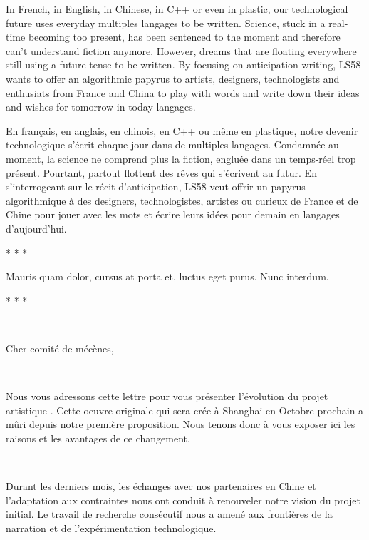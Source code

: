 In French, in English, in Chinese, in C++ or even in plastic, our
technological future uses everyday multiples langages to be written.
Science, stuck in a real-time becoming too present, has been sentenced
to the moment and therefore can{\textquoteright}t understand fiction
anymore. However, dreams that are floating everywhere still using a
future tense to be written. By focusing on anticipation writing, LS58
wants to offer an algorithmic papyrus to artists, designers,
technologists and enthusiats from France and China to play with words
and write down their ideas and wishes for tomorrow in today langages.

En fran\c{c}ais, en anglais, en chinois, en C++ ou m\^eme en plastique,
notre devenir technologique s{\textquoteright}\'ecrit chaque jour dans
de multiples langages. Condamn\'ee au moment, la science ne comprend
plus la fiction, englu\'ee dans un temps-r\'eel trop pr\'esent.
Pourtant, partout flottent des r\^eves qui s{\textquoteright}\'ecrivent
au futur. En s{\textquoteright}interrogeant sur le r\'ecit
d{\textquoteright}anticipation, LS58 veut offrir un papyrus
algorithmique \`a des designers, technologistes, artistes ou curieux de
France et de Chine pour jouer avec les mots et \'ecrire leurs id\'ees
pour demain en langages d{\textquoteright}aujourd{\textquoteright}hui. 

{\centering
* * *
\par}

{\centering
Mauris quam dolor, cursus at porta et, luctus eget purus. Nunc interdum.
\par}

{\centering
* * *
\par}

~

{\centering
Cher comit\'e de m\'ec\`enes,
\par}

~

Nous vous adressons cette lettre pour vous pr\'esenter
l{\textquoteright}\'evolution du projet artistique
. Cette oeuvre
originale qui sera cr\'ee \`a Shanghai en Octobre prochain a m\^uri
depuis notre premi\`ere proposition. Nous tenons donc \`a vous exposer
ici les raisons et les avantages de ce changement.

~

Durant les derniers mois, les \'echanges avec nos partenaires en Chine
et l{\textquoteright}adaptation aux contraintes nous ont conduit \`a
renouveler notre vision du projet initial. Le travail de recherche
cons\'ecutif nous a amen\'e aux fronti\`eres de la narration et de
l{\textquoteright}exp\'erimentation technologique.

